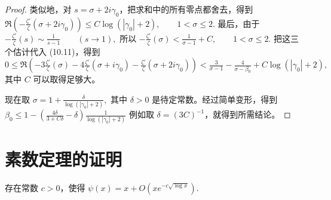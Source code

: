 \begin{proof}
	类似地，对 $s=\sigma+2i\gamma_0$，把求和中的所有零点都舍去，得到
	\(\textstyle \Re\left( -\frac{\zeta'}{\zeta}(\sigma+\allowbreak{}2i\gamma_0) \right) \leq\allowbreak{} C\log(|\gamma_0|+\allowbreak{}2),\allowbreak{} \qquad 1<\sigma\leq2.\)
	最后，由于
	\(\textstyle -\frac{\zeta'}{\zeta}(s)\sim\allowbreak{}\frac1{s-1} \qquad(s\to1),\allowbreak{}\)
	所以
	\(\textstyle -\frac{\zeta'}{\zeta}(\sigma) < \frac1{\sigma-1}+\allowbreak{}C,\allowbreak{} \qquad 1<\sigma\leq2.\)
	把这三个估计代入 (10.11)，得到
	\(\textstyle 0 \leq\allowbreak{} \Re\left( -3\frac{\zeta'}{\zeta}(\sigma) -4\frac{\zeta'}{\zeta}(\sigma+\allowbreak{}i\gamma_0) -\frac{\zeta'}{\zeta}(\sigma+\allowbreak{}2i\gamma_0) \right) < \frac3{\sigma-1} - \frac4{\sigma-\beta_0} +\allowbreak{} C\log(|\gamma_0|+\allowbreak{}2),\allowbreak{}\)
	其中 $C$ 可以取得足够大。

	现在取
	\(\textstyle \sigma =\allowbreak{} 1+\allowbreak{}\frac{\delta}{\log(|\gamma_0|+\allowbreak{}2)},\allowbreak{}\)
	其中 $\delta>0$ 是待定常数。经过简单变形，得到
	\(\textstyle \beta_0 \leq\allowbreak{} 1 - \left( \frac{4\delta}{3+\allowbreak{}C\delta} - \delta \right) \frac1{\log(|\gamma_0|+\allowbreak{}2)}\)
	例如取 $\delta=(3C)^{-1}$，就得到所需结论。
\end{proof}

\section{素数定理的证明}

\begin{theorem}
	存在常数 $c>0$，使得
	\(\textstyle \psi(x) =\allowbreak{} x+\allowbreak{}O\left(xe^{-c\sqrt{\log x}}\right).\)
\end{theorem}

